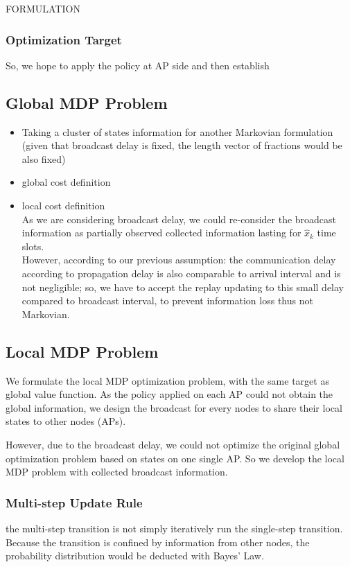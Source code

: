 \documentclass[10pt, conference, letterpaper]{IEEEtran}
\begin{document}
\begin{section}{FORMULATION}
            \subsubsection{Optimization Target}


        So, we hope to apply the policy at AP side and then establish

        \subsection{Global MDP Problem}
        \begin{itemize}
            \item Taking a cluster of states information for another Markovian formulation (given that broadcast delay is fixed, the length vector of fractions would be also fixed)
            \item global cost definition
            \item local cost definition \\
            As we are considering broadcast delay, we could re-consider the broadcast information as partially observed collected information lasting for $\hat{x}_k$ time slots.
            \\
            However, according to our previous assumption: the communication delay according to propagation delay is also comparable to arrival interval and is not negligible; so, we have to accept the replay updating to this small delay compared to broadcast interval, to prevent information loss thus not Markovian.
        \end{itemize}

        \subsection{Local MDP Problem}
        We formulate the local MDP optimization problem, with the same target as global value function. As the policy applied on each AP could not obtain the global information, we design the broadcast for every nodes to share their local states to other nodes (APs).
        
        However, due to the broadcast delay, we could not optimize the original global optimization problem based on states on one single AP. So we develop the local MDP problem with collected broadcast information.

            \subsubsection{Multi-step Update Rule}
            the multi-step transition is not simply iteratively run the single-step transition. Because the transition is confined by information from other nodes, the probability distribution would be deducted with Bayes' Law.


\end{section}
\end{document}
